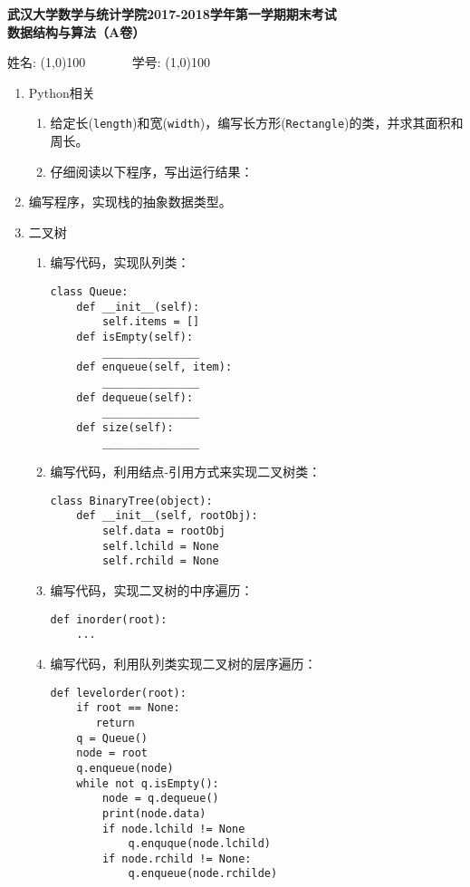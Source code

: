 \documentclass[8pt]{article}
\newlength{\la}
\newlength{\lc}
\newlength{\ld}
\begin{document}
\begin{CJK}{UTF8}{gkai}
\begin{center}
{\Large \bf  武汉大学数学与统计学院2017-2018学年第一学期期末考试\\[0.1in]
  数据结构与算法（A卷）} \vspace{0.1in}

姓名: \line(1,0){100} ~~~~~~ 学号: \line(1,0){100}

\end{center}


\begin{enumerate} %
\item Python相关
  \begin{enumerate}
  \item 给定长(\lstinline{length})和宽(\lstinline{width})，编写长方形(\lstinline{Rectangle})的类，并求其面积和周长。
  \item 仔细阅读以下程序，写出运行结果：
    
  \end{enumerate}
\item 编写程序，实现栈的抽象数据类型。
\item 二叉树
  \begin{enumerate}
  \item 编写代码，实现队列类：
    \begin{lstlisting}
class Queue:
    def __init__(self):
        self.items = []
    def isEmpty(self):
        _______________
    def enqueue(self, item):
        _______________
    def dequeue(self):
        _______________    
    def size(self):
        _______________
    \end{lstlisting}
  \item 编写代码，利用结点-引用方式来实现二叉树类：
    \begin{lstlisting}
class BinaryTree(object):
    def __init__(self, rootObj):
        self.data = rootObj
        self.lchild = None
        self.rchild = None
    \end{lstlisting}
  \item 编写代码，实现二叉树的中序遍历：
    \begin{lstlisting}
def inorder(root):
    ...
    \end{lstlisting}
  \item 编写代码，利用队列类实现二叉树的层序遍历：
    \begin{lstlisting}
def levelorder(root):
    if root == None:
       return 
    q = Queue()
    node = root
    q.enqueue(node)
    while not q.isEmpty():
        node = q.dequeue()
        print(node.data)
        if node.lchild != None
            q.enquque(node.lchild)
        if node.rchild != None:
            q.enqueue(node.rchilde)
      \end{lstlisting}
  \end{enumerate}
\end{enumerate}



\end{CJK}
\end{document}
